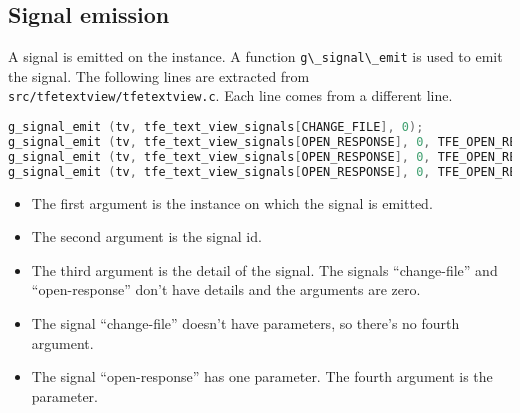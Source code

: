 \subsection{Signal emission}\label{signal-emission}

A signal is emitted on the instance. A function
\passthrough{\lstinline!g\_signal\_emit!} is used to emit the signal.
The following lines are extracted from
\passthrough{\lstinline!src/tfetextview/tfetextview.c!}. Each line comes
from a different line.

\begin{lstlisting}[language=C]
g_signal_emit (tv, tfe_text_view_signals[CHANGE_FILE], 0);
g_signal_emit (tv, tfe_text_view_signals[OPEN_RESPONSE], 0, TFE_OPEN_RESPONSE_SUCCESS);
g_signal_emit (tv, tfe_text_view_signals[OPEN_RESPONSE], 0, TFE_OPEN_RESPONSE_CANCEL);
g_signal_emit (tv, tfe_text_view_signals[OPEN_RESPONSE], 0, TFE_OPEN_RESPONSE_ERROR);
\end{lstlisting}

\begin{itemize}
\tightlist
\item
  The first argument is the instance on which the signal is emitted.
\item
  The second argument is the signal id.
\item
  The third argument is the detail of the signal. The signals
  ``change-file'' and ``open-response'' don't have details and the
  arguments are zero.
\item
  The signal ``change-file'' doesn't have parameters, so there's no
  fourth argument.
\item
  The signal ``open-response'' has one parameter. The fourth argument is
  the parameter.
\end{itemize}
